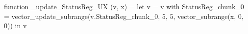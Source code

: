 function _update_StatusReg_UX (v, x) = let v = { v with StatusReg_chunk_0 = vector_update_subrange(v.StatusReg_chunk_0, 5, 5, vector_subrange(x, 0, 0)) } in v
